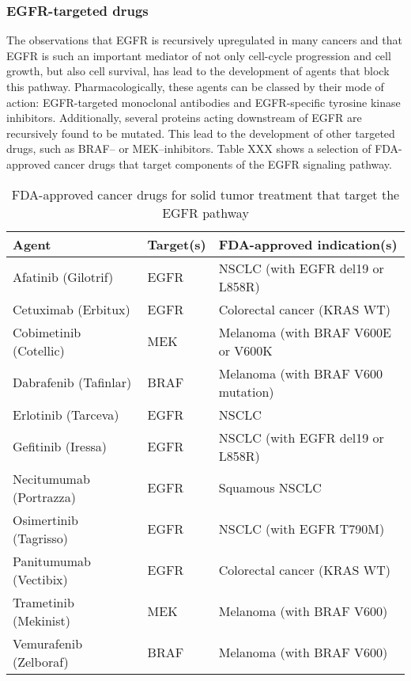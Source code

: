 {{{    \subsubsection{EGFR-targeted drugs}

      The observations that EGFR is recursively upregulated in many cancers
      and that EGFR is such an important mediator of not only cell-cycle
      progression and cell growth, but also cell survival, has lead to the
      development of agents that block this pathway. Pharmacologically,
      these agents can be classed by their mode of action: EGFR-targeted
      monoclonal antibodies and EGFR-specific tyrosine kinase inhibitors.
      Additionally, several proteins acting downstream of EGFR are recursively
      found to be mutated. This lead to the development of other targeted
      drugs, such as BRAF-- or MEK--inhibitors. Table XXX shows a selection
      of FDA-approved cancer drugs that target components of the EGFR signaling
      pathway.

      \begin{table}[!htbp]
          \caption[Targeted Cancer Agents]{FDA-approved cancer drugs for solid tumor treatment that target the EGFR pathway}
          \centering
          \begin{tabular}{ |p{4cm}|p{3.7cm}|p{6.3cm}|}
          \hline
          Agent & Target(s) & FDA-approved indication(s) \\ \hline \hline
          Afatinib (Gilotrif) & EGFR & NSCLC (with EGFR del19 or L858R) \\
          Cetuximab (Erbitux) & EGFR & Colorectal cancer (KRAS WT) \\
          Cobimetinib (Cotellic) & MEK & Melanoma (with BRAF V600E or V600K \\
          Dabrafenib (Tafinlar) & BRAF & Melanoma (with BRAF V600 mutation) \\
          Erlotinib (Tarceva) & EGFR & NSCLC \\
          Gefitinib (Iressa) & EGFR & NSCLC (with EGFR del19 or L858R) \\
          Necitumumab (Portrazza) & EGFR & Squamous NSCLC \\
          Osimertinib (Tagrisso) & EGFR & NSCLC (with EGFR T790M) \\
          Panitumumab (Vectibix) & EGFR & Colorectal cancer (KRAS WT) \\
          Trametinib (Mekinist) & MEK & Melanoma (with BRAF V600) \\
          Vemurafenib (Zelboraf) & BRAF & Melanoma (with BRAF V600) \\
          \hline
        \end{tabular}
      \end{table}

}}}
